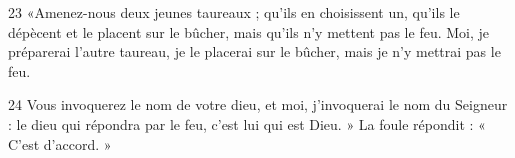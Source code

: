 
23 «Amenez-nous deux jeunes taureaux ; qu’ils en choisissent un, qu’ils le dépècent et le placent sur le bûcher, mais qu’ils n’y mettent pas le feu. Moi, je préparerai l’autre taureau, je le placerai sur le bûcher, mais je n’y mettrai pas le feu.

24 Vous invoquerez le nom de votre dieu, et moi, j’invoquerai le nom du Seigneur : le dieu qui répondra par le feu, c’est lui qui est Dieu. » La foule répondit : « C’est d’accord. »
